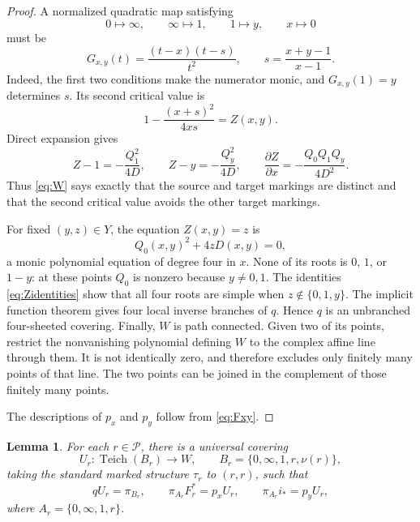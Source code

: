 \documentclass[11pt]{article}
\newcommand{\Teich}{\operatorname{Teich}}
\newcommand{\Par}{\mathcal P}
\newtheorem{lemma}[theorem]{Lemma}
\theoremstyle{definition}
\theoremstyle{remark}
\begin{document}
\begin{proof}
A normalized quadratic map satisfying
\[
0\longmapsto\infty,\qquad
\infty\longmapsto1,\qquad
1\longmapsto y,\qquad x\longmapsto0
\]
must be
\begin{equation}\label{eq:Fxy}
G_{x,y}(t)=\frac{(t-x)(t-s)}{t^2},
\qquad s=\frac{x+y-1}{x-1}.
\end{equation}
Indeed, the first two conditions make the numerator monic, and
$G_{x,y}(1)=y$ determines $s$.
Its second critical value is
\[
1-\frac{(x+s)^2}{4xs}=Z(x,y).
\]
Direct expansion gives
\begin{equation}\label{eq:Zidentities}
Z-1=-\frac{Q_1^2}{4D},\qquad
Z-y=-\frac{Q_y^2}{4D},\qquad
\frac{\partial Z}{\partial x}
=-\frac{Q_0Q_1Q_y}{4D^2}.
\end{equation}
Thus \eqref{eq:W} says exactly that the source and target markings
are distinct and that the second critical value avoids the other
target markings.

For fixed $(y,z)\in Y$, the equation $Z(x,y)=z$ is
\[
Q_0(x,y)^2+4zD(x,y)=0,
\]
a monic polynomial equation of degree four in $x$.
None of its roots is $0$, $1$, or $1-y$:
at these points $Q_0$ is nonzero because $y\ne0,1$.
The identities \eqref{eq:Zidentities} show that all four roots are
simple when $z\notin\{0,1,y\}$.  The implicit function theorem gives
four local inverse branches of $q$.  Hence $q$ is an unbranched
four-sheeted covering.
Finally, $W$ is path connected.  Given two of its points, restrict
the nonvanishing polynomial defining $W$ to the complex affine line
through them.  It is not identically zero, and therefore excludes only
finitely many points of that line.  The two points can be joined in
the complement of those finitely many points.

The descriptions of $p_x$ and $p_y$ follow from
\eqref{eq:Fxy}.
\end{proof}

\begin{lemma}\label{lem:teich}
For each $r\in\Par$, there is a universal covering
\[
U_r:\Teich(B_r)\longrightarrow W,\qquad
B_r=\{0,\infty,1,r,\nu(r)\},
\]
taking the standard marked structure $\tau_r$ to $(r,r)$, such that
\begin{equation}\label{eq:coverdiagram}
qU_r=\pi_{B_r},\qquad
\pi_{A_r}F_r^*=p_xU_r,\qquad
\pi_{A_r}i_*=p_yU_r,
\end{equation}
where $A_r=\{0,\infty,1,r\}$.
\end{lemma}
\end{document}
